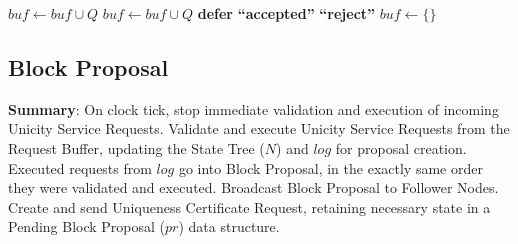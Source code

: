 \begin{algorithm}
  \caption{Input Handling}\label{alg:input}
  \begin{algorithmic}[0]
                         
           \State {}  
            
            
             \State $buf \gets buf \cup Q$   
           \EndIf
         \Else               {}
           \State $buf \gets buf \cup Q$
         \EndIf
       \EndIf
    \EndMessage
    \State
                      
        \State \textbf{defer} 
        \State \Return \textbf{``accepted''}
      \Else
        \State \Return \textbf{``reject''}
      \EndIf
    \EndMessage
    \State
      \State {}
                      
        \State {}  
      \Else
         
          \State $buf \gets \{\}$   
          \State   {}
       \EndIf
    \EndIf
    \EndEvent
  \end{algorithmic}
\end{algorithm}


\subsection{Block Proposal}\label{block-production}

\textbf{Summary}: On clock tick, stop immediate validation and execution of incoming Unicity Service Requests. Validate and execute Unicity Service Requests from the Request Buffer, updating the State Tree ($N$) and $log$ for proposal creation. Executed requests from $log$ go into Block Proposal, in the exactly same order they were validated and executed.
Broadcast Block Proposal to Follower Nodes. Create and send Uniqueness Certificate Request, retaining necessary state in a Pending Block Proposal ($pr$) data structure.

